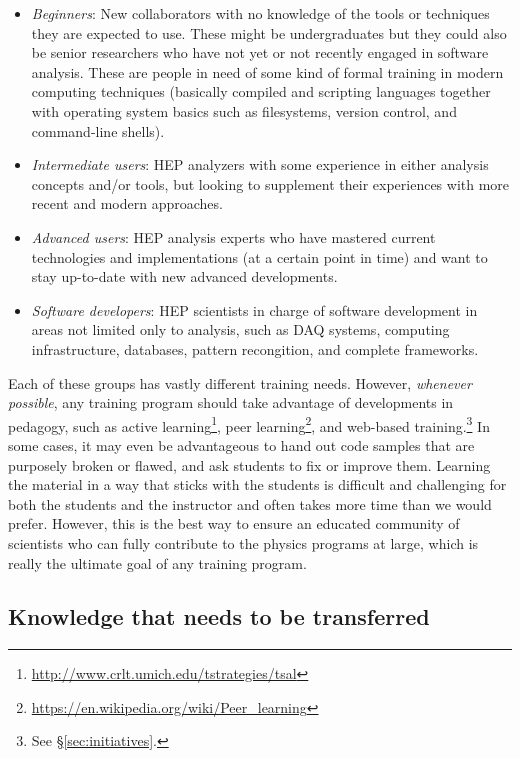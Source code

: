 \begin{itemize}[itemsep=0pt,parsep=0pt,topsep=5pt,partopsep=0pt]
   \item \emph{Beginners}: New collaborators with no knowledge of the tools or techniques they are expected to use. These might be undergraduates but they could also be senior researchers who have not yet or not recently engaged in software analysis. These are people in need of some kind of formal training in modern computing techniques (basically compiled and scripting languages together with operating system basics such as filesystems, version control, and command-line shells).
   \item \emph{Intermediate users}: HEP analyzers with some experience in either analysis concepts and/or tools, but  looking to supplement their experiences with more recent and modern approaches. 
   \item \emph{Advanced users}: HEP analysis experts who have mastered current technologies and implementations (at a certain point in time) and want to stay up-to-date with new advanced developments.
   \item \emph{Software developers}: HEP scientists in charge of software development in areas not limited only to analysis, such as DAQ systems, computing infrastructure, databases, pattern recongition, and complete frameworks.
\end{itemize}

Each of these groups has vastly different training needs. However, \emph{whenever possible}, any training program should take advantage of developments in pedagogy, such as active learning\footnote{\url{http://www.crlt.umich.edu/tstrategies/tsal}}, peer learning\footnote{\url{https://en.wikipedia.org/wiki/Peer_learning}}, and web-based training.\footnote{See \S\ref{sec:initiatives}.} In some cases, it may even be advantageous to hand out code samples that are purposely broken or flawed, and ask students to fix or improve them. Learning the material in a way that sticks with the students is difficult and challenging for both the students and the instructor and often takes more time than we would prefer. However, this is the best way to ensure an educated community of scientists who can fully contribute to the physics programs at large, which is really the ultimate goal of any training program. 

\subsection{Knowledge that needs to be transferred}


